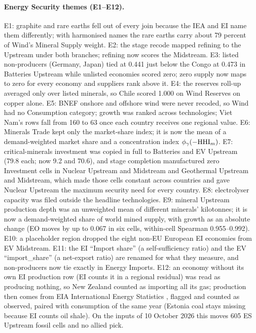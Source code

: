\paragraph{Energy Security themes (E1--E12).} E1: graphite and rare earths fell out of every join
because the IEA and EI name them differently; with harmonised names the rare earths carry about 79
percent of Wind's Mineral Supply weight. E2: the stage recode mapped refining to the Upstream under
both branches; refining now scores the Midstream. E3: listed non-producers (Germany, Japan) tied at
0.441 just below the Congo at 0.473 in Batteries Upstream while unlisted economies scored zero; zero
supply now maps to zero for every economy and suppliers rank above it. E4: the reserves roll-up
averaged only over listed minerals, so Chile scored 1.000 on Wind Reserves on copper alone. E5: BNEF
onshore and offshore wind were never recoded, so Wind had no Consumption category; growth was ranked
across technologies; Viet Nam's rows fall from 160 to 63 once each country receives one regional
value. E6: Minerals Trade kept only the market-share index; it is now the mean of a demand-weighted
market share and a concentration index $\phi_{\gamma}(-\mathrm{HHI}_m)$. E7: critical-minerals investment was
copied in full to Batteries and EV Upstream (79.8 each; now 9.2 and 70.6), and stage completion
manufactured zero Investment cells in Nuclear Upstream and Midstream and Geothermal Upstream and
Midstream, which made those cells constant across countries and gave Nuclear Upstream the maximum
security need for every country. E8: electrolyser capacity was filed outside the headline
technologies. E9: mineral Upstream production depth was an unweighted mean of different minerals'
kilotonnes; it is now a demand-weighted share of world mined supply, with growth as an absolute
change (EO moves by up to 0.067 in six cells, within-cell Spearman 0.955--0.992). E10: a placeholder
region dropped the eight non-EU European EI economies from EV Midstream. E11: the EI ``Import
share'' (a self-sufficiency ratio) and the EV ``import\_share'' (a net-export ratio) are renamed for
what they measure, and non-producers now tie exactly in Energy Imports. E12: an economy without its
own EI production row (EI counts it in a regional residual) was read as producing nothing, so New
Zealand counted as importing all its gas; production then comes from EIA International Energy
Statistics \citep{eia2026international}, flagged and counted as observed, paired with consumption of
the same year (Estonia coal stays missing because EI counts oil shale). On the inputs of 10 October
2026 this moves 605 ES Upstream fossil cells and no allied pick.

